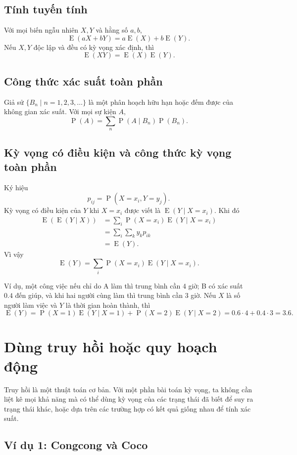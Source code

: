 \documentclass[11pt]{article}
\newcommand{\E}{\operatorname{E}}
\newcommand{\Prob}{\operatorname{P}}
\begin{document}
\subsection{Tính tuyến tính}

Với mọi biến ngẫu nhiên \(X,Y\) và hằng số \(a,b\),
\[
  \E(aX+bY)=a\E(X)+b\E(Y).
\]
Nếu \(X,Y\) độc lập và đều có kỳ vọng xác định, thì
\[
  \E(XY)=\E(X)\E(Y).
\]

\subsection{Công thức xác suất toàn phần}

Giả sử \(\{B_n\mid n=1,2,3,\ldots\}\) là một phân hoạch hữu hạn hoặc đếm được
của không gian xác suất. Với mọi sự kiện \(A\),
\[
  \Prob(A)=\sum_n \Prob(A\mid B_n)\Prob(B_n).
\]

\subsection{Kỳ vọng có điều kiện và công thức kỳ vọng toàn phần}

Ký hiệu
\[
  p_{ij}=\Prob(X=x_i,Y=y_j).
\]
Kỳ vọng có điều kiện của \(Y\) khi \(X=x_i\) được viết là
\(\E(Y\mid X=x_i)\). Khi đó
\[
\begin{aligned}
  \E(\E(Y\mid X))
  &=\sum_i \Prob(X=x_i)\E(Y\mid X=x_i)\\
  &=\sum_i\sum_k y_k p_{ik}\\
  &=\E(Y).
\end{aligned}
\]
Vì vậy
\[
  \E(Y)=\sum_i \Prob(X=x_i)\E(Y\mid X=x_i).
\]

Ví dụ, một công việc nếu chỉ do A làm thì trung bình cần \(4\) giờ; B có xác
suất \(0.4\) đến giúp, và khi hai người cùng làm thì trung bình cần \(3\) giờ.
Nếu \(X\) là số người làm việc và \(Y\) là thời gian hoàn thành, thì
\[
  \E(Y)=\Prob(X=1)\E(Y\mid X=1)+\Prob(X=2)\E(Y\mid X=2)
  =0.6\cdot4+0.4\cdot3=3.6.
\]

\section{Dùng truy hồi hoặc quy hoạch động}

Truy hồi là một thuật toán cơ bản. Với một phần bài toán kỳ vọng, ta không cần
liệt kê mọi khả năng mà có thể dùng kỳ vọng của các trạng thái đã biết để suy
ra trạng thái khác, hoặc dựa trên các trường hợp có kết quả giống nhau để tính
xác suất.

\subsection{Ví dụ 1: Congcong và Coco}
\end{document}
